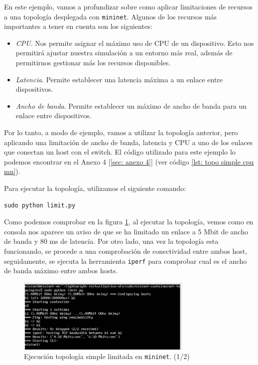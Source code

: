 \documentclass[a4paper, oneside, 12pt]{book}
\begin{document}
	\noindent En este ejemplo, vamos a profundizar sobre como aplicar limitaciones de recursos a una topología desplegada con \texttt{mininet}. Algunos de los recursos más importantes a tener en cuenta son los siguientes:
	
	\begin{itemize}
		\item \textit{CPU}. Nos permite asignar el máximo uso de CPU de un dispositivo. Esto nos permitirá ajustar nuestra simulación a un entorno más real, además de permitirnos gestionar más los recursos disponibles.
		\item \textit{Latencia}. Permite establecer una latencia máxima a un enlace entre dispositivos.
		\item \textit{Ancho de banda}. Permite establecer un máximo de ancho de banda para un enlace entre dispositivos.
	\end{itemize}
	
	\noindent Por lo tanto, a modo de ejemplo, vamos a utilizar la topología anterior, pero aplicando una limitación de ancho de banda, latencia y CPU a uno de los enlaces que conectan un host con el switch. El código utilizado para este ejemplo lo podemos encontrar en el Anexo 4 [\ref{sec: anexo 4}] (ver código \ref{lst: topo simple cpu mn}).
	
	\noindent Para ejecutar la topología, utilizamos el siguiente comando:
	\begin{verbatim}
sudo python limit.py	
	\end{verbatim}

	\noindent Como podemos comprobar en la figura \ref{img: mn limit 1}, al ejecutar la topología, vemos como en consola nos aparece un aviso de que se ha limitado un enlace a 5 Mbit de ancho de banda y 80 ms de latencia. Por otro lado, una vez la topología esta funcionando, se procede a una comprobación de conectividad entre ambos host, seguidamente, se ejecuta la herramienta \texttt{iperf} para comprobar cual es el ancho de banda máximo entre ambos hosts.
	
	\pagebreak
	
	\begin{figure}[h!]
		\begin{center}
			\includegraphics[width=0.75\textwidth]{img/mn_limit_1.png}
			\caption{Ejecución topología simple limitada en \texttt{mininet}. (1/2)}
			\label{img: mn limit 1}	
		\end{center}
	\end{figure}
\end{document}
